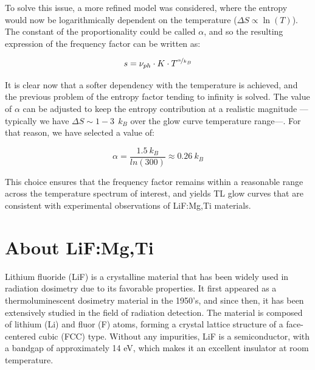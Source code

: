 To solve this issue, a more refined model was considered, where the entropy would now be logarithmically dependent on the temperature ($\Delta S \propto \ln(T)$). The constant of the proportionality could be called $\alpha$, and so the resulting expression of the frequency factor can be written as:

\begin{equation}\label{eq:freqfactor_lnT}
    s = \nu_{ph} \cdot K \cdot T^{\nicefrac{\alpha}{k_B}}
\end{equation}

\vspace{10pt}

It is clear now that a softer dependency with the temperature is achieved, and the previous problem of the entropy factor tending to infinity is solved. The value of $\alpha$ can be adjusted to keep the entropy contribution at a realistic magnitude ---typically we have $\Delta S \sim  1\!-\!3 ~~k_B$ over the glow curve temperature range---. For that reason, we have selected a value of:

\begin{equation}
    \alpha = \frac{1.5 ~k_B}{ln(300)} \approx 0.26 ~k_B
\end{equation}

\vspace{10pt}

This choice ensures that the frequency factor remains within a reasonable range across the temperature spectrum of interest, and yields TL glow curves that are consistent with experimental observations of LiF:Mg,Ti materials.


\section{About LiF:Mg,Ti} \label{sec:LiF}


Lithium fluoride (LiF) is a crystalline material that has been widely used in radiation dosimetry due to its favorable %
properties. It first appeared as a thermoluminescent dosimetry material in the 1950's, and since then, it has been extensively studied in the field of radiation detection. The material is composed of lithium (Li) and fluor (F) %
atoms, forming a crystal lattice structure of a face-centered cubic (FCC) type. Without any impurities, LiF is a semiconductor, with a bandgap of approximately 14 eV, which makes it an excellent insulator at room temperature.

\vspace{10pt}

